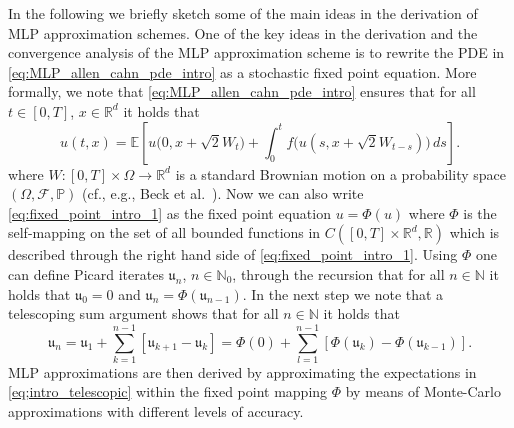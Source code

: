 \documentclass[12pt]{article}
\theoremstyle{definition}
\newcommand{\R}{\mathbb{R}}
\renewcommand{\P}{\mathbb{P}}
\newcommand{\E}{\mathbb{E}}
\newcommand{\N}{\mathbb{N}}
\begin{document}
In the following we briefly sketch some of the main ideas 
in the derivation of MLP approximation schemes. 
One of the key ideas in the derivation and the convergence analysis 
of the MLP approximation scheme is to rewrite 
the PDE in \eqref{eq:MLP_allen_cahn_pde_intro} as a 
stochastic fixed point equation. More formally, we note that 
\eqref{eq:MLP_allen_cahn_pde_intro} ensures that 
for all $ t \in [0,T] $, $ x \in \R^d $ it holds that
\begin{equation}
\label{eq:fixed_point_intro_1}
  u(t,x) 
  =
  \E\!\left[ 
    u\big( 
      0, x + \sqrt{2} W_t 
    \big) 
    +
    \int_0^t 
    f\big( 
      u(s, x + \sqrt{2} W_{ t - s } ) 
    \big)
    \, ds
  \right]
  .
\end{equation}
where $ W \colon [0,T] \times \Omega \to \R^d $ 
is a standard Brownian motion 
on a probability space $ ( \Omega, \mathcal{F}, \P ) $ 
(cf., e.g., Beck et al.~\cite[Theorem~1.1]{beck2020nonlinear}). 
Now we can also write \eqref{eq:fixed_point_intro_1} 
as the fixed point equation 
$ u = \Phi( u ) $
%
where $ \Phi $ is the self-mapping on the set of all bounded functions 
in $ C( [0,T] \times \R^d, \R ) $ which is described through 
the right hand side of \eqref{eq:fixed_point_intro_1}. 
Using $ \Phi $ one can define Picard iterates $ \mathfrak{u}_n $, $ n \in \N_0 $, through the recursion 
that for all $ n \in \N $ it holds that
$ \mathfrak{u}_0 = 0 $ and $ \mathfrak{u}_n = \Phi( \mathfrak{u}_{ n - 1 } ) $. 
In the next step we note that a telescoping sum argument shows that for all $ n \in \N $ it holds that
\begin{equation}
\label{eq;intro_telescopic}
  \mathfrak{u}_n 
%
  = \mathfrak{u}_1 + \sum_{ k = 1 }^{ n - 1 } \left[ \mathfrak{u}_{ k + 1 } - \mathfrak{u}_k \right]
  = \Phi( 0 ) + \sum_{ l = 1 }^{ n - 1 } \left[ \Phi( \mathfrak{u}_k ) - \Phi( \mathfrak{u}_{ k - 1 } ) \right] 
  .
\end{equation}
MLP approximations are then derived by approximating 
the expectations in \eqref{eq;intro_telescopic} 
within the fixed point mapping $ \Phi $ by means of Monte-Carlo approximations 
with different levels of accuracy. 
\end{document}

